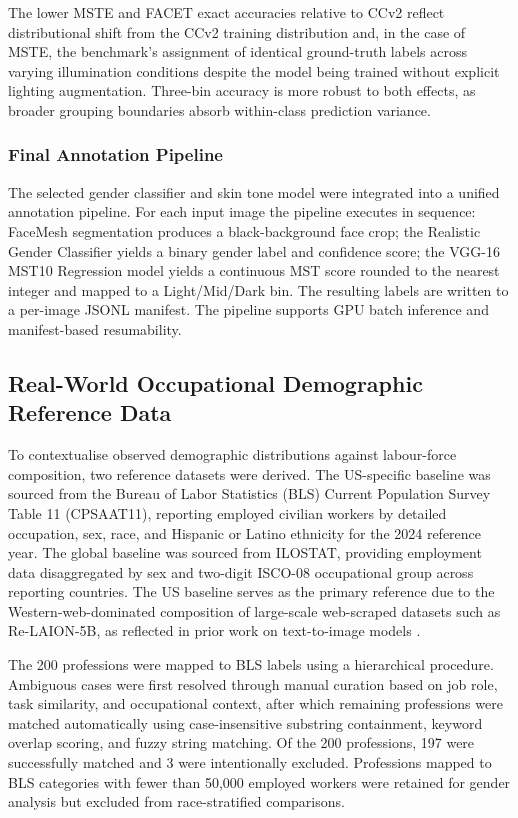 The lower MSTE and FACET exact accuracies relative to CCv2 reflect distributional shift from the CCv2 training distribution and, in the case of MSTE, the benchmark's assignment of identical ground-truth labels across varying illumination conditions despite the model being trained without explicit lighting augmentation. Three-bin accuracy is more robust to both effects, as broader grouping boundaries absorb within-class prediction variance.

\subsubsection{Final Annotation Pipeline}
\label{subsubsec:annotation_pipeline}

The selected gender classifier and skin tone model were integrated into a unified annotation pipeline. For each input image the pipeline executes in sequence: FaceMesh segmentation produces a black-background face crop; the Realistic Gender Classifier yields a binary gender label and confidence score; the VGG-16 MST10 Regression model yields a continuous MST score rounded to the nearest integer and mapped to a Light/Mid/Dark bin. The resulting labels are written to a per-image JSONL manifest. The pipeline supports GPU batch inference and manifest-based resumability.

\subsection{Real-World Occupational Demographic Reference Data}
\label{subsec:bls_reference}

To contextualise observed demographic distributions against labour-force composition, two reference datasets were derived. The US-specific baseline was sourced from the Bureau of Labor Statistics (BLS) Current Population Survey Table 11 (CPSAAT11), reporting employed civilian workers by detailed occupation, sex, race, and Hispanic or Latino ethnicity for the 2024 reference year. The global baseline was sourced from ILOSTAT, providing employment data disaggregated by sex and two-digit ISCO-08 occupational group across reporting countries. The US baseline serves as the primary reference due to the Western-web-dominated composition of large-scale web-scraped datasets such as Re-LAION-5B, as reflected in prior work on text-to-image models \cite{Bianchi_2023_TTIGenAmplifiesDemographicStereotypes, Luccioni_2023_AnalyzingSocietalRepresentationsDiffusionModels}.

The 200 professions were mapped to BLS labels using a hierarchical procedure. Ambiguous cases were first resolved through manual curation based on job role, task similarity, and occupational context, after which remaining professions were matched automatically using case-insensitive substring containment, keyword overlap scoring, and fuzzy string matching. Of the 200 professions, 197 were successfully matched and 3 were intentionally excluded. Professions mapped to BLS categories with fewer than 50,000 employed workers were retained for gender analysis but excluded from race-stratified comparisons.


